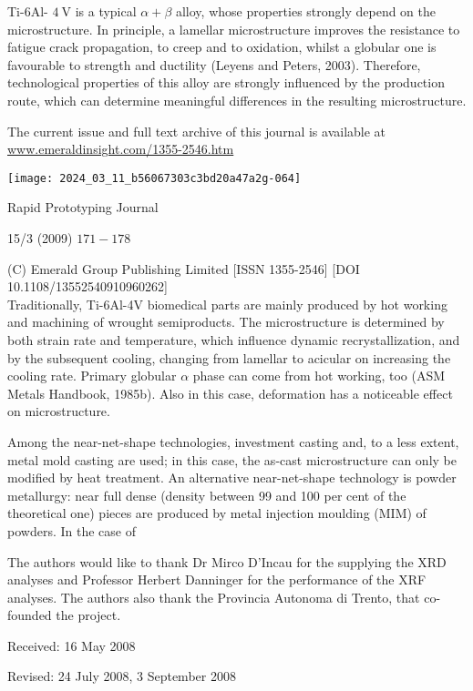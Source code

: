 \documentclass[10pt]{article}
\begin{document}
Ti-6Al- $4 \mathrm{~V}$ is a typical $\alpha+\beta$ alloy, whose properties strongly depend on the microstructure. In principle, a lamellar microstructure improves the resistance to fatigue crack propagation, to creep and to oxidation, whilst a globular one is favourable to strength and ductility (Leyens and Peters, 2003). Therefore, technological properties of this alloy are strongly influenced by the production route, which can determine meaningful differences in the resulting microstructure.

The current issue and full text archive of this journal is available at \href{http://www.emeraldinsight.com/1355-2546.htm}{www.emeraldinsight.com/1355-2546.htm}

\begin{center}
\texttt{[image: 2024\_03\_11\_b56067303c3bd20a47a2g-064]}
\end{center}

Rapid Prototyping Journal

15/3 (2009) $171-178$

(C) Emerald Group Publishing Limited [ISSN 1355-2546] [DOI 10.1108/13552540910960262]\\
Traditionally, Ti-6Al-4V biomedical parts are mainly produced by hot working and machining of wrought semiproducts. The microstructure is determined by both strain rate and temperature, which influence dynamic recrystallization, and by the subsequent cooling, changing from lamellar to acicular on increasing the cooling rate. Primary globular $\alpha$ phase can come from hot working, too (ASM Metals Handbook, 1985b). Also in this case, deformation has a noticeable effect on microstructure.

Among the near-net-shape technologies, investment casting and, to a less extent, metal mold casting are used; in this case, the as-cast microstructure can only be modified by heat treatment. An alternative near-net-shape technology is powder metallurgy: near full dense (density between 99 and 100 per cent of the theoretical one) pieces are produced by metal injection moulding (MIM) of powders. In the case of

The authors would like to thank Dr Mirco D'Incau for the supplying the XRD analyses and Professor Herbert Danninger for the performance of the XRF analyses. The authors also thank the Provincia Autonoma di Trento, that co-founded the project.

Received: 16 May 2008

Revised: 24 July 2008, 3 September 2008
\end{document}

